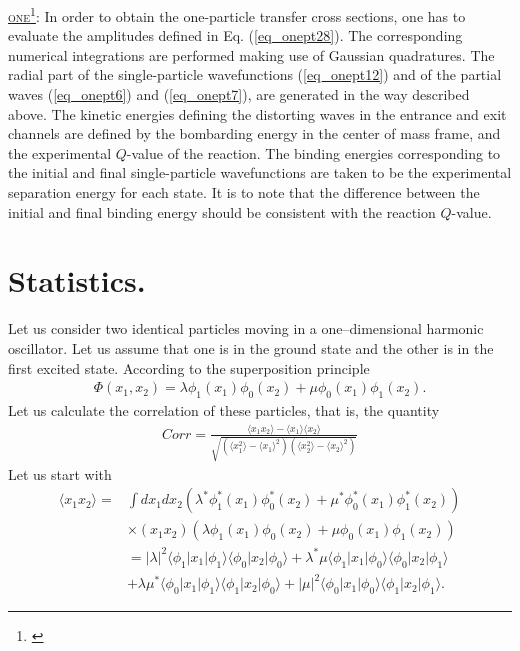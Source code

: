 \begin{subappendices}
\underline{\textsc{one}}\footnote{\cite{Potel:12b}}: In order to obtain the  one-particle transfer cross sections, one has to evaluate  the amplitudes defined in Eq. (\ref{eq_onept28}). The corresponding numerical integrations are   performed making use of Gaussian quadratures. The radial part of the single-particle  wavefunctions (\ref{eq_onept12}) and of the partial waves (\ref{eq_onept6}) and (\ref{eq_onept7}), are generated in the way described above. The kinetic energies defining the distorting waves in the entrance and exit channels are defined by the bombarding energy in the center of mass frame, and the experimental $Q$-value of the reaction. The binding energies corresponding to the initial and final single-particle wavefunctions are taken to be the experimental separation energy for each state. It is to note that the difference between the initial and final binding energy should be consistent with the reaction $Q$-value.  



   

\section{Statistics.}\label{App6D}
Let us consider two identical particles moving in a one--dimensional harmonic oscillator. Let us assume  that one is in the ground state and the other  is in the first excited state. According to the superposition principle 
\begin{align}\label{eqApp6G1}
\Phi(x_1,x_2)=\lambda\phi_1(x_1)\phi_0(x_2)+\mu\phi_0(x_1)\phi_1(x_2).
\end{align} 
Let us calculate the correlation of these particles, that is, the quantity
\begin{align}\label{eqApp6G2}
Corr=\frac{\langle x_1x_2\rangle-\langle x_1\rangle\langle x_2\rangle}{\sqrt{\left(\langle x_1^2\rangle-\langle x_1\rangle^2\right)\left(\langle x_2^2\rangle-\langle x_2\rangle^2\right)}}
\end{align} 
Let us start with
\begin{align}\label{eqApp63}
\nonumber\langle x_1x_2\rangle=&\int dx_1 dx_2 \left(\lambda^*\phi_1^*(x_1)\phi_0^*(x_2)+\mu^*\phi_0^*(x_1)\phi_1^*(x_2)\right)\\
\nonumber&\times(x_1 x_2)\left(\lambda\phi_1(x_1)\phi_0(x_2)+\mu\phi_0(x_1)\phi_1(x_2)\right)\\
\nonumber &=|\lambda|^2\langle\phi_1|x_1|\phi_1\rangle\langle\phi_0|x_2|\phi_0\rangle+\lambda^*\mu\langle\phi_1|x_1|\phi_0\rangle\langle\phi_0|x_2|\phi_1\rangle\\
&+\lambda\mu^*\langle\phi_0|x_1|\phi_1\rangle\langle\phi_1|x_2|\phi_0\rangle+|\mu|^2\langle\phi_0|x_1|\phi_0\rangle\langle\phi_1|x_2|\phi_1\rangle.
\end{align} 


\end{subappendices}
